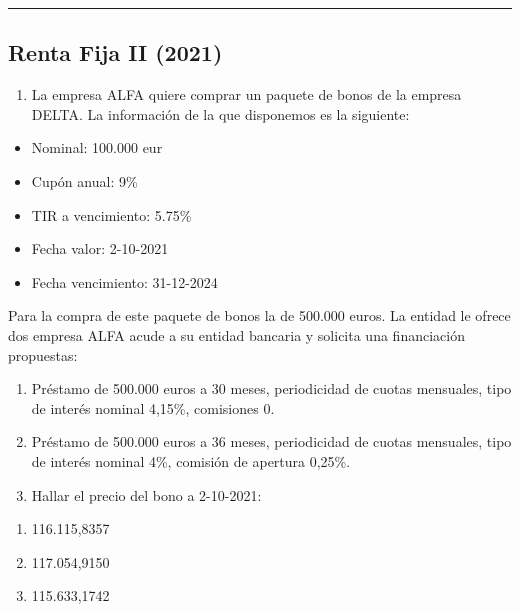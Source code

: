\documentclass[
  letterpaper,
  DIV=11,
  numbers=noendperiod]{scrartcl}
\providecommand{\tightlist}{%
  \setlength{\itemsep}{0pt}\setlength{\parskip}{0pt}}\usepackage{longtable,booktabs,array}
\begin{document}
\begin{center}\rule{0.5\linewidth}{0.5pt}\end{center}

\hypertarget{renta-fija-ii-2021}{%
\subsection{Renta Fija II (2021)}\label{renta-fija-ii-2021}}

\begin{enumerate}
\def\labelenumi{\arabic{enumi}.}
\tightlist
\item
  La empresa ALFA quiere comprar un paquete de bonos de la empresa
  DELTA. La información de la que disponemos es la siguiente:
\end{enumerate}

\begin{itemize}
\item
  Nominal: 100.000 eur
\item
  Cupón anual: 9\%
\item
  TIR a vencimiento: 5.75\%
\item
  Fecha valor: 2-10-2021
\item
  Fecha vencimiento: 31-12-2024
\end{itemize}

Para la compra de este paquete de bonos la de 500.000 euros. La entidad
le ofrece dos empresa ALFA acude a su entidad bancaria y solicita una
financiación propuestas:

\begin{enumerate}
\def\labelenumi{\arabic{enumi}.}
\item
  Préstamo de 500.000 euros a 30 meses, periodicidad de cuotas
  mensuales, tipo de interés nominal 4,15\%, comisiones 0.
\item
  Préstamo de 500.000 euros a 36 meses, periodicidad de cuotas
  mensuales, tipo de interés nominal 4\%, comisión de apertura 0,25\%.
\item
  Hallar el precio del bono a 2-10-2021:
\end{enumerate}

\begin{enumerate}
\def\labelenumi{\alph{enumi}.}
\item
  116.115,8357
\item
  117.054,9150
\item
  115.633,1742
\end{enumerate}
\end{document}
